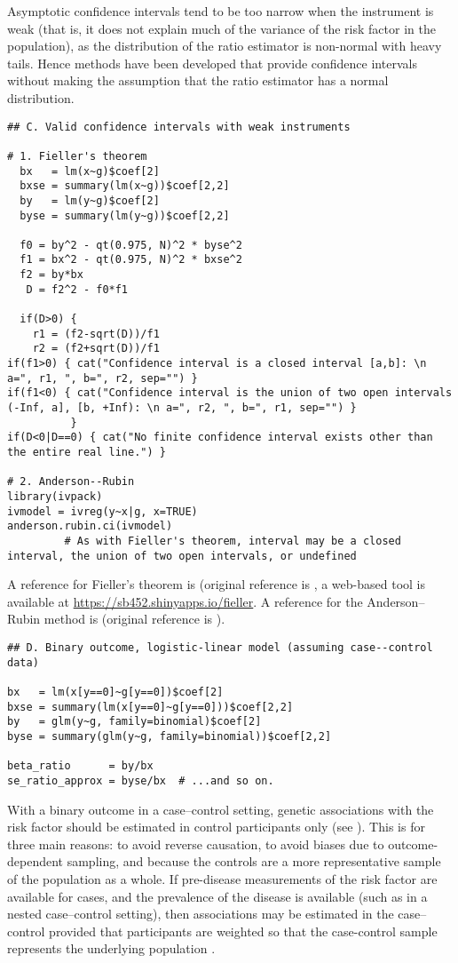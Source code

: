 \documentclass[a4paper,12pt]{article} %
\begin{document}
Asymptotic confidence intervals tend to be too narrow when the instrument is weak (that is, it does not explain much of the variance of the risk factor in the population), as the distribution of the ratio estimator is non-normal with heavy tails. Hence methods have been developed that provide confidence intervals without making the assumption that the ratio estimator has a normal distribution.

\begin{lstlisting}
## C. Valid confidence intervals with weak instruments

# 1. Fieller's theorem
  bx   = lm(x~g)$coef[2]
  bxse = summary(lm(x~g))$coef[2,2]
  by   = lm(y~g)$coef[2]
  byse = summary(lm(y~g))$coef[2,2]

  f0 = by^2 - qt(0.975, N)^2 * byse^2
  f1 = bx^2 - qt(0.975, N)^2 * bxse^2
  f2 = by*bx
   D = f2^2 - f0*f1

  if(D>0) {
    r1 = (f2-sqrt(D))/f1
    r2 = (f2+sqrt(D))/f1
if(f1>0) { cat("Confidence interval is a closed interval [a,b]: \n a=", r1, ", b=", r2, sep="") }
if(f1<0) { cat("Confidence interval is the union of two open intervals (-Inf, a], [b, +Inf): \n a=", r2, ", b=", r1, sep="") }
          }
if(D<0|D==0) { cat("No finite confidence interval exists other than the entire real line.") }

# 2. Anderson--Rubin
library(ivpack)
ivmodel = ivreg(y~x|g, x=TRUE)
anderson.rubin.ci(ivmodel)
         # As with Fieller's theorem, interval may be a closed interval, the union of two open intervals, or undefined
\end{lstlisting}

A reference for Fieller's theorem is \cite{buonaccorsi2005} (original reference is \cite{fieller1954}, a web-based tool is available at \url{https://sb452.shinyapps.io/fieller}. A reference for the Anderson--Rubin method is \cite{mikusheva2010} (original reference is \cite{anderson1949}).

\begin{lstlisting}
## D. Binary outcome, logistic-linear model (assuming case--control data)

bx   = lm(x[y==0]~g[y==0])$coef[2]
bxse = summary(lm(x[y==0]~g[y==0]))$coef[2,2]
by   = glm(y~g, family=binomial)$coef[2]
byse = summary(glm(y~g, family=binomial))$coef[2,2]

beta_ratio      = by/bx
se_ratio_approx = byse/bx  # ...and so on.
\end{lstlisting}

With a binary outcome in a case--control setting, genetic associations with the risk factor should be estimated in control participants only (see \cite{didelez2007}). This is for three main reasons: to avoid reverse causation, to avoid biases due to outcome-dependent sampling, and because the controls are a more representative sample of the population as a whole. If pre-disease measurements of the risk factor are available for cases, and the prevalence of the disease is available (such as in a nested case--control setting), then associations may be estimated in the case--control provided that participants are weighted so that the case-control sample represents the underlying population \citep{bowden2011}.
\end{document}
